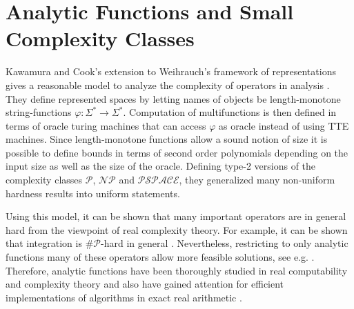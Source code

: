 \documentclass{article}
\newcommand{\p}{\ensuremath{\mathcal P}\xspace}
\newcommand{\np}{\ensuremath{\mathcal{NP}}\xspace}
\newcommand{\sharpp}{\ensuremath{\# \mathcal{P}}\xspace}
\newcommand{\pspace}{\ensuremath{ \mathcal{PSPACE}}\xspace}
\begin{document}
\section*{Analytic Functions and Small Complexity Classes}
Kawamura and Cook's extension to Weihrauch's framework of representations \cite{Weihrauch} gives a reasonable model to analyze the complexity of operators in analysis \cite{AkiACM}.
They define represented spaces by letting names of objects be length-monotone string-functions $\varphi: \Sigma^* \to \Sigma^*$. 
Computation of multifunctions is then defined in terms of oracle turing machines that can access $\varphi$ as oracle instead of using TTE machines.
Since length-monotone functions allow a sound notion of size it is possible to define bounds in terms of second order polynomials depending on the input size as well as the size of the oracle.
Defining type-2 versions of the complexity classes \p, \np and \pspace, they generalized many non-uniform hardness results into uniform statements.

Using this model, it can be shown that many important operators are in general hard from the viewpoint of real complexity theory. 
For example, it can be shown that integration is \sharpp-hard in general \cite{MR748898,AkiACM}.
Nevertheless, restricting to only analytic functions many of these operators allow more feasible solutions, see e.g. \cite{MR1137517, Kawamura2012}.  
Therefore, analytic functions have been thoroughly studied in real computability and complexity theory and also have gained attention for efficient implementations of algorithms in exact real arithmetic \cite{DBLP:journals/corr/abs-1006-0401}.
\end{document}
